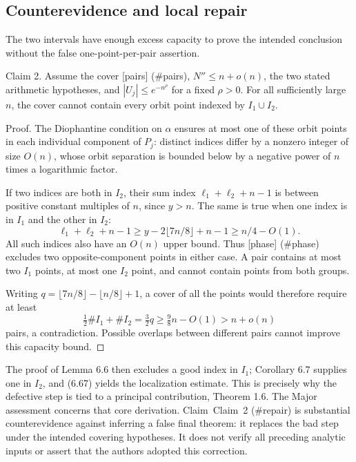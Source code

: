 \documentclass[10pt]{article}
\begin{document}
\subsection*{Counterevidence and local repair}
The two intervals have enough excess capacity to prove the intended conclusion without the false one-point-per-pair assertion.\par
Claim 2.  Assume the cover [pairs] (\#pairs), \(N''\le n+o(n)\), the two stated arithmetic hypotheses, and \(|U_j|\le e^{-n^\rho}\) for a fixed \(\rho>0\). For all sufficiently large \(n\), the cover cannot contain every orbit point indexed by \(I_1\cup I_2\).\par
Proof. The Diophantine condition on \(\alpha\) ensures at most one of these orbit points in each individual component of \(P_j\): distinct indices differ by a nonzero integer of size \(O(n)\), whose orbit separation is bounded below by a negative power of \(n\) times a logarithmic factor.\par
If two indices are both in \(I_2\), their sum index \(\ell_1+\ell_2+n-1\) is between positive constant multiples of \(n\), since \(y>n\). The same is true when one index is in \(I_1\) and the other in \(I_2\): \[\ell_1+\ell_2+n-1
 \ge y-2\lfloor7n/8\rfloor+n-1
 \ge n/4-O(1).\] All such indices also have an \(O(n)\) upper bound. Thus [phase] (\#phase) excludes two opposite-component points in either case. A pair contains at most two \(I_1\) points, at most one \(I_2\) point, and cannot contain points from both groups.\par
Writing \(q=\lfloor7n/8\rfloor-\lfloor n/8\rfloor+1\), a cover of all the points would therefore require at least \[\tfrac12\#I_1+\#I_2=\tfrac32q
 \ge \tfrac98n-O(1)>n+o(n)\] pairs, a contradiction. Possible overlaps between different pairs cannot improve this capacity bound. ◻\par
The proof of Lemma 6.6 then excludes a good index in \(I_1\); Corollary 6.7 supplies one in \(I_2\), and (6.67) yields the localization estimate. This is precisely why the defective step is tied to a principal contribution, Theorem 1.6. The Major assessment concerns that core derivation. Claim Claim 2 (\#repair) is substantial counterevidence against inferring a false final theorem: it replaces the bad step under the intended covering hypotheses. It does not verify all preceding analytic inputs or assert that the authors adopted this correction.\par
\end{document}
